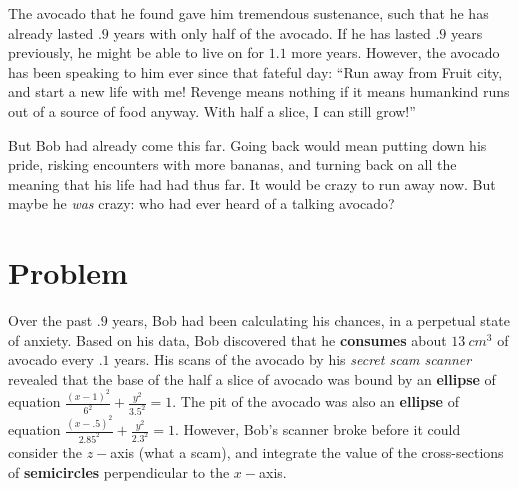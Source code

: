\documentclass[letterpaper, 12pt]{article}
\begin{document}
The avocado that he found gave him tremendous sustenance, such that he has already lasted $.9$ years with only half of the avocado. If he has lasted $.9$ years previously, he might be able to live on for $1.1$ more years. However, the avocado has been speaking to him ever since that fateful day: “Run away from Fruit city, and start a new life with me! Revenge means nothing if it means humankind runs out of a source of food anyway. With half a slice, I can still grow!” \par
But Bob had already come this far. Going back would mean putting down his pride, risking encounters with more bananas, and turning back on all the meaning that his life had had thus far. It would be crazy to run away now. But maybe he \textit{was} crazy: who had ever heard of a talking avocado? \par
\section{Problem}
Over the past $.9$ years, Bob had been calculating his chances, in a perpetual state of anxiety. Based on his data, Bob discovered that he \textbf{consumes} about $13\:cm^3$ of avocado every $.1$ years. His scans of the avocado by his \textit{secret scam scanner} revealed that the base of the half a slice of avocado was bound by an \textbf{ellipse} of equation $\frac{\left(x-1\right)^{2}}{6^{2}}+\frac{y^{2}}{3.5^{2}}=1$. The pit of the avocado was also an \textbf{ellipse} of equation $\frac{\left(x-.5\right)^{2}}{2.85^{2}}+\frac{y^{2}}{2.3^{2}}=1$. However, Bob's scanner broke before it could consider the $z-$axis (what a scam), and integrate the value of the cross-sections of \textbf{semicircles} perpendicular to the $x-$axis.\par
\end{document}
